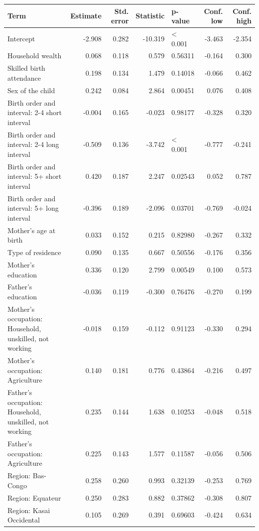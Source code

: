 \documentclass[
  11pt,
  a4paper,
]{article}
\begin{document}
\begin{longtable}[t]{>{\raggedright\arraybackslash}p{4.5cm}rrrlrr}
\\
\toprule
\textbf{Term} & \textbf{Estimate} & \textbf{Std. error} & \textbf{Statistic} & \textbf{p-value} & \textbf{Conf. low} & \textbf{Conf. high}\\
\midrule
Intercept & -2.908 & 0.282 & -10.319 & < 0.001 & -3.463 & -2.354\\
Household wealth & 0.068 & 0.118 & 0.579 & 0.56311 & -0.164 & 0.300\\
Skilled birth attendance & 0.198 & 0.134 & 1.479 & 0.14018 & -0.066 & 0.462\\
Sex of the child & 0.242 & 0.084 & 2.864 & 0.00451 & 0.076 & 0.408\\
Birth order and interval: 2-4 short interval & -0.004 & 0.165 & -0.023 & 0.98177 & -0.328 & 0.320\\
\addlinespace
Birth order and interval: 2-4 long interval & -0.509 & 0.136 & -3.742 & < 0.001 & -0.777 & -0.241\\
Birth order and interval: 5+ short interval & 0.420 & 0.187 & 2.247 & 0.02543 & 0.052 & 0.787\\
Birth order and interval: 5+ long interval & -0.396 & 0.189 & -2.096 & 0.03701 & -0.769 & -0.024\\
Mother's age at birth & 0.033 & 0.152 & 0.215 & 0.82980 & -0.267 & 0.332\\
Type of residence & 0.090 & 0.135 & 0.667 & 0.50556 & -0.176 & 0.356\\
\addlinespace
Mother's education & 0.336 & 0.120 & 2.799 & 0.00549 & 0.100 & 0.573\\
Father's education & -0.036 & 0.119 & -0.300 & 0.76476 & -0.270 & 0.199\\
Mother's occupation: Household, unskilled, not working & -0.018 & 0.159 & -0.112 & 0.91123 & -0.330 & 0.294\\
Mother's occupation: Agriculture & 0.140 & 0.181 & 0.776 & 0.43864 & -0.216 & 0.497\\
Father's occupation: Household, unskilled, not working & 0.235 & 0.144 & 1.638 & 0.10253 & -0.048 & 0.518\\
\addlinespace
Father's occupation: Agriculture & 0.225 & 0.143 & 1.577 & 0.11587 & -0.056 & 0.506\\
Region: Bas-Congo & 0.258 & 0.260 & 0.993 & 0.32139 & -0.253 & 0.769\\
Region: Equateur & 0.250 & 0.283 & 0.882 & 0.37862 & -0.308 & 0.807\\
Region: Kasai Occidental & 0.105 & 0.269 & 0.391 & 0.69603 & -0.424 & 0.634\\

\end{longtable}
\end{document}
